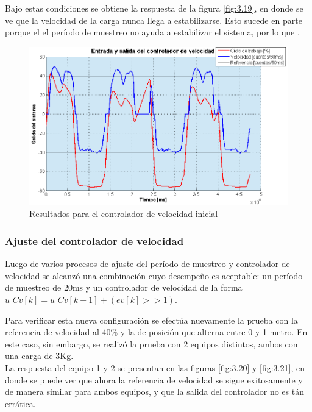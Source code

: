 Bajo estas condiciones se obtiene la respuesta de la figura \ref{fig:3.19}, en donde se ve que la velocidad de la carga nunca llega a estabilizarse. Esto sucede en parte porque el el período de muestreo no ayuda a estabilizar el sistema, por lo que .

\begin{figure}[!ht]
	\centering
	\includegraphics[width=16cm,scale=1]{resources/3_19-esquemaControl1.png}
	\caption{Resultados para el controlador de velocidad inicial}
	\label{fig:\thefigure}
\end{figure}

\subsubsection{Ajuste del controlador de velocidad}
Luego de varios procesos de ajuste del período de muestreo y controlador de velocidad se alcanzó una combinación cuyo desempeño es aceptable: un período de muestreo de 20ms y un controlador de velocidad de la forma \(u\_Cv[k] = u\_Cv[k-1] + (ev[k] >> 1)\).

Para verificar esta nueva configuración se efectúa nuevamente la prueba con la referencia de velocidad al 40\% y la de posición que alterna entre 0 y 1 metro. En este caso, sin embargo, se realizó la prueba con 2 equipos distintos, ambos con una carga de 3Kg.\\
La respuesta del equipo 1 y 2 se presentan en las figuras \ref{fig:3.20} y \ref{fig:3.21}, en donde se puede ver que ahora la referencia de velocidad se sigue exitosamente y de manera similar para ambos equipos, y que la salida del controlador no es tán errática.

